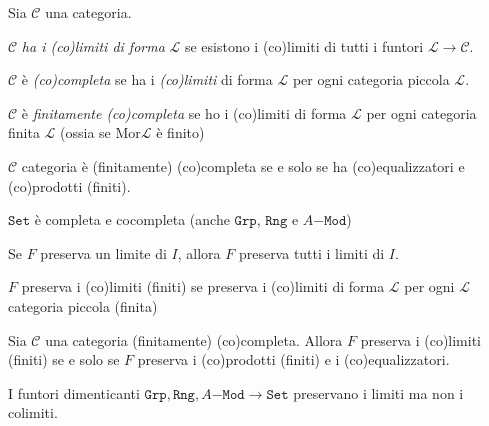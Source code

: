 \begin{definition}{}
    Sia \(\mathcal{C}\) una categoria.

    \(\mathcal{C}\) \emph{ha i (co)limiti di forma} \(\mathcal{L}\) se esistono i
    (co)limiti di tutti i funtori \(\mathcal{L} \to \mathcal{C}\).

    \(\mathcal{C}\) è \emph{(co)completa} se ha i \emph{(co)limiti} di forma \(\mathcal{L}\) per ogni categoria piccola \(\mathcal{L}\).

    \(\mathcal{C}\) è \emph{finitamente (co)completa} se ho i (co)limiti di
    forma \(\mathcal{L}\) per ogni categoria finita \(\mathcal{L}\) (ossia se \(\mathrm{Mor} \mathcal{L}\) è finito)
\end{definition}

\begin{corollary}{}
    \(\mathcal{C}\) categoria è (finitamente) (co)completa se e solo se ha (co)equalizzatori e
    (co)prodotti (finiti).
\end{corollary}

\begin{example}{}
    \(\mathtt{Set}\) è completa e cocompleta (anche \(\mathtt{Grp}\), \(\mathtt{Rng}\) e \(A\mathtt{-Mod}\))
\end{example}

\begin{remark}{}
    Se \(F\) preserva un limite di \(I\), allora \(F\) preserva tutti i
    limiti di \(I\).
\end{remark}

\(F\) preserva i (co)limiti (finiti) se preserva i (co)limiti di forma \(\mathcal{L}\) per ogni \(\mathcal{L}\) categoria piccola (finita)

\begin{corollary}{}
    Sia \(\mathcal{C}\) una categoria (finitamente) (co)completa.
    Allora \(F\) preserva i (co)limiti (finiti) se e solo se \(F\) preserva i
    (co)prodotti (finiti) e i (co)equalizzatori.
\end{corollary}

\begin{example}{}
    I funtori dimenticanti \(\mathtt{Grp} , \mathtt{Rng} , A\mathtt{-Mod} \to \mathtt{Set}\) preservano i limiti ma non i colimiti.
\end{example}

